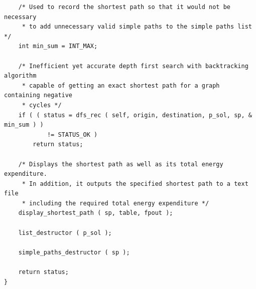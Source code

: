 \documentclass[11pt]{article}
\begin{document}
\begin{verbatim}
    /* Used to record the shortest path so that it would not be necessary
     * to add unnecessary valid simple paths to the simple paths list */
    int min_sum = INT_MAX;

    /* Inefficient yet accurate depth first search with backtracking algorithm
     * capable of getting an exact shortest path for a graph containing negative
     * cycles */
    if ( ( status = dfs_rec ( self, origin, destination, p_sol, sp, & min_sum ) )
            != STATUS_OK )
        return status;

    /* Displays the shortest path as well as its total energy expenditure.
     * In addition, it outputs the specified shortest path to a text file
     * including the required total energy expenditure */
    display_shortest_path ( sp, table, fpout );

    list_destructor ( p_sol );

    simple_paths_destructor ( sp );

    return status;
}
\end{verbatim}
\newpage
\end{document}
